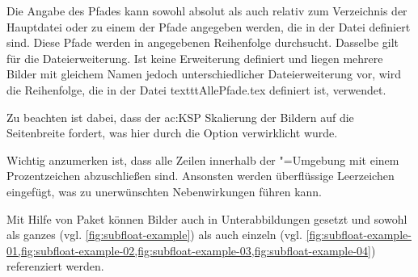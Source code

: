 Die Angabe des Pfades kann sowohl absolut als auch relativ
zum Verzeichnis der Hauptdatei oder zu einem der Pfade angegeben werden,
die in der Datei  definiert sind.
Diese Pfade werden in angegebenen Reihenfolge durchsucht.
Dasselbe gilt für die Dateierweiterung.
Ist keine Erweiterung definiert und liegen mehrere Bilder mit gleichem Namen jedoch unterschiedlicher Dateierweiterung vor,
wird die Reihenfolge, die in der Datei texttt{AllePfade.tex} definiert ist, verwendet.

Zu beachten ist dabei, dass der \gls{ac:KSP} Skalierung der Bildern auf die Seitenbreite fordert,
was hier durch die Option  verwirklicht wurde.

Wichtig anzumerken ist, dass alle Zeilen innerhalb der "=Umgebung
mit einem Prozentzeichen abzuschließen sind.
Ansonsten werden überflüssige Leerzeichen eingefügt,
was zu unerwünschten Nebenwirkungen führen kann.

Mit Hilfe von Paket  \cite{Cochran2005} können Bilder auch in
Unterabbildungen gesetzt
und sowohl als ganzes (vgl. \cref{fig:subfloat-example}) als auch einzeln (vgl.
\cref{fig:subfloat-example-01,fig:subfloat-example-02,fig:subfloat-example-03,fig:subfloat-example-04})
referenziert werden.

